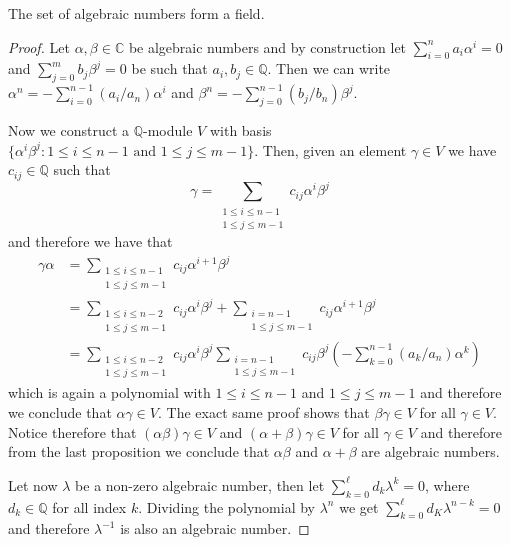 \begin{proposition}
   The set of algebraic numbers form a field.
\end{proposition}

\begin{proof}
   Let \(\alpha, \beta \in \mathbb{C}\) be algebraic numbers and by construction
   let \(\sum_{i=0}^n a_i \alpha^i = 0\) and \(\sum_{j=0}^m b_j \beta^j = 0\) be
   such that \(a_i, b_j \in \mathbb{Q}\). Then we can write \(\alpha^n =
   -\sum_{i=0}^{n-1} (a_i/a_n)\alpha^i\) and \(\beta^n = - \sum_{j=0}^{n-1}
   (b_j/b_n) \beta^j\).

   Now we construct a \(\mathbb{Q}\)-module \(V\) with basis  \(\{\alpha^i
   \beta^j : 1 \leqslant i \leqslant n-1 \text{ and } 1 \leqslant j \leqslant
   m-1\}\). Then, given an element \(\gamma \in V\) we have \(c_{ij} \in
   \mathbb{Q}\) such that
   \[
      \gamma = \sum_{\substack{1 \leqslant i \leqslant n-1 \\ 1 \leqslant j
      \leqslant m-1}} c_{ij} \alpha^i \beta^j
   \] 
   and therefore we have that
   \begin{align*}
      \gamma \alpha 
      &= \sum_{\substack{1 \leqslant i \leqslant n-1 \\ 1 \leqslant
      j \leqslant m-1}} c_{ij} \alpha^{i+1} \beta^j 
      \\
      &= \sum_{\substack{1 \leqslant i \leqslant n - 2 \\ 1 \leqslant j \leqslant
      m-1}} c_{ij}\alpha^i \beta^j 
      + \sum_{\substack{i=n-1 \\ 1 \leqslant j \leqslant m-1}} c_{ij}
      \alpha^{i+1} \beta^j 
      \\
      &= \sum_{\substack{1 \leqslant i \leqslant n - 2 \\ 1 \leqslant j
      \leqslant m-1}} c_{ij} \alpha^i \beta^j \sum_{\substack{i = n-1 \\ 1
      \leqslant j \leqslant m-1}} c_{ij} \beta^j \left( - \sum_{k=0}^{n-1} (a_k/a_n)
      \alpha^k \right) 
   \end{align*}
   which is again a polynomial with \(1 \leqslant i \leqslant n-1\) and \(1
   \leqslant j \leqslant m-1\) and therefore we conclude that \(\alpha \gamma
   \in V\). The exact same proof shows that \(\beta \gamma \in V\) for all
   \(\gamma \in V\). Notice therefore that \((\alpha\beta)\gamma \in V\) and
   \((\alpha + \beta) \gamma \in V\) for all \(\gamma \in V\) and therefore from
   the last proposition we conclude that \(\alpha\beta\) and  \(\alpha + \beta\)
   are algebraic numbers.

   Let now \(\lambda\) be a non-zero algebraic number, then let
   \(\sum_{k=0}^\ell d_k \lambda^k = 0\), where \(d_k \in \mathbb{Q}\) for all
   index \(k\). Dividing the polynomial by \(\lambda^n\) we get \(\sum_{k =
   0}^\ell d_K \lambda^{n-k} = 0\) and therefore \(\lambda^{-1}\) is also an
   algebraic number.
\end{proof}

